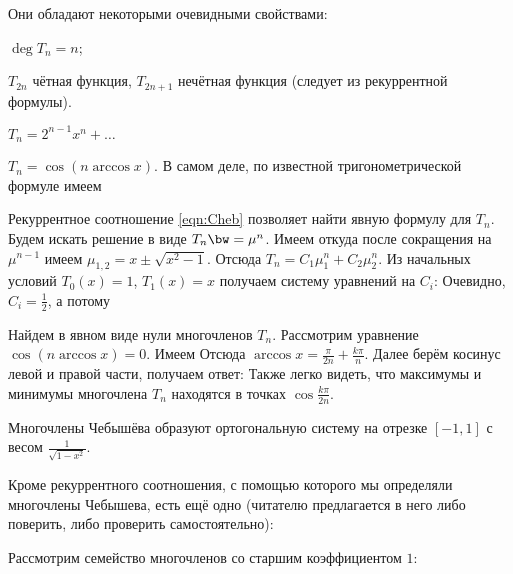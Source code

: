 \documentclass[a4paper]{article}
\begin{document}
Они обладают некоторыми очевидными свойствами:

\begin{nums}{-1}
\item $\deg T_n = n$;
\item $T_{2n}$ чётная функция, $T_{2n+1}$ нечётная функция (следует из
  рекуррентной формулы).
\item $T_n = 2^{n-1}x^n + \dots$
\item $T_n = \cos(n\arccos x)$. В самом деле, по известной
  тригонометрической формуле имеем 
\end{nums}

Рекуррентное соотношение \eqref{eqn:Cheb} позволяет найти явную
формулу для $T_n$. Будем искать решение в виде $T_n \bw= \mu^n$. Имеем
 откуда после сокращения на
$\mu^{n-1}$ имеем $\mu_{1,2} = x\pm \sqrt{x^2-1}$. Отсюда $T_n = C_1
\mu_1^n + C_2 \mu_2^n$.  Из начальных условий $T_0(x)=1$, $T_1(x)=x$
получаем систему уравнений на $C_i$:   Очевидно, $C_i = \frac12$, а потому

Найдем в явном виде нули многочленов $T_n$. Рассмотрим уравнение
$\cos(n\arccos x)=0$. Имеем 
Отсюда $\arccos x = \frac{\pi}{2n} + \frac{k\pi}{n}$. Далее берём
косинус левой и правой части, получаем ответ:   Также легко видеть, что максимумы и
минимумы многочлена $T_n$ находятся в точках $\cos\frac{k\pi}{2n}$.

\begin{note}
Многочлены Чебышёва образуют ортогональную систему на отрезке $[-1,1]$
с весом $\frac{1}{\sqrt{1-x^2}}$.
\end{note}

Кроме рекуррентного соотношения, с помощью которого мы определяли
многочлены Чебышева, есть ещё одно (читателю предлагается в него либо
поверить, либо проверить самостоятельно): 

Рассмотрим семейство многочленов со старшим коэффициентом $1$:
\end{document}
